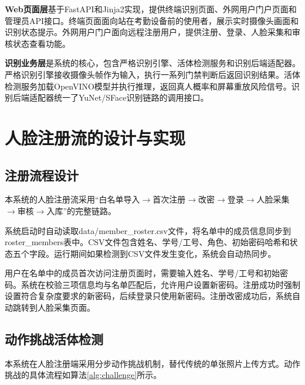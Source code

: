 \textbf{Web页面层}基于FastAPI和Jinja2实现，提供终端识别页面、外网用户门户页面和管理员API接口。终端页面面向站在考勤设备前的使用者，展示实时摄像头画面和识别状态提示。外网用户门户面向远程注册用户，提供注册、登录、人脸采集和审核状态查看功能。

\textbf{识别业务层}是系统的核心，包含严格识别引擎、活体检测服务和识别后端适配器。严格识别引擎接收摄像头帧作为输入，执行一系列门禁判断后返回识别结果。活体检测服务加载OpenVINO模型并执行推理，返回真人概率和屏幕重放风险信号。识别后端适配器统一了YuNet/SFace识别链路的调用接口。

\section{人脸注册流的设计与实现}

\subsection{注册流程设计}

本系统的人脸注册流采用``白名单导入$\to$首次注册$\to$改密$\to$登录$\to$人脸采集$\to$审核$\to$入库''的完整链路。

系统启动时自动读取data/member\_roster.csv文件，将名单中的成员信息同步到roster\_members表中。CSV文件包含姓名、学号/工号、角色、初始密码哈希和状态五个字段。运行期间如果检测到CSV文件发生变化，系统会自动热同步。

用户在名单中的成员首次访问注册页面时，需要输入姓名、学号/工号和初始密码。系统在校验三项信息均与名单匹配后，允许用户设置新密码。注册成功时强制设置符合复杂度要求的新密码，后续登录只使用新密码。注册改密成功后，系统自动跳转到人脸采集页面。

\subsection{动作挑战活体检测}

本系统在人脸注册端采用分步动作挑战机制，替代传统的单张照片上传方式。动作挑战的具体流程如算法\ref{alg:challenge}所示。

